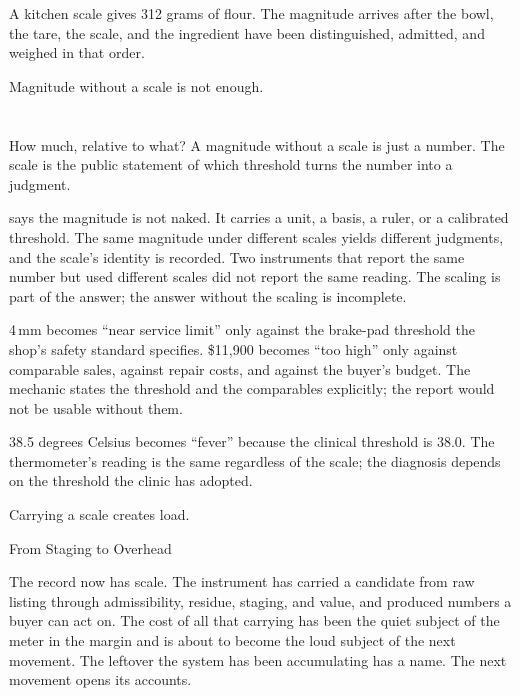 A kitchen scale gives 312 grams of flour. The magnitude arrives after
the bowl, the tare, the scale, and the ingredient have been
distinguished, admitted, and weighed in that order.

Magnitude without a scale is not enough.

\section{}
\label{se:scaled}

How much, relative to what? A magnitude without a scale is just a
number. The scale is the public statement of which threshold turns the
number into a judgment.

 says the magnitude is not naked. It carries a unit, a
basis, a ruler, or a calibrated threshold. The same magnitude under
different scales yields different judgments, and the scale's identity
is recorded. Two instruments that report the same number but used
different scales did not report the same reading. The scaling is part
of the answer; the answer without the scaling is incomplete.

4{\,}mm becomes ``near service limit'' only against the brake-pad
threshold the shop's safety standard specifies. \$11{,}900 becomes
``too high'' only against comparable sales, against repair costs, and
against the buyer's budget. The mechanic states the threshold and the
comparables explicitly; the report would not be usable without them.

38.5 degrees Celsius becomes ``fever'' because the clinical threshold
is 38.0. The thermometer's reading is the same regardless of the
scale; the diagnosis depends on the threshold the clinic has adopted.

Carrying a scale creates load.

\begin{movement}{From Staging to Overhead}

The record now has scale. The instrument has carried a candidate from
raw listing through admissibility, residue, staging, and value, and
produced numbers a buyer can act on. The cost of all that carrying has
been the quiet subject of the meter in the margin and is about to
become the loud subject of the next movement. The leftover the system
has been accumulating has a name. The next movement opens its accounts.

\end{movement}

\section{}
\label{se:load}

